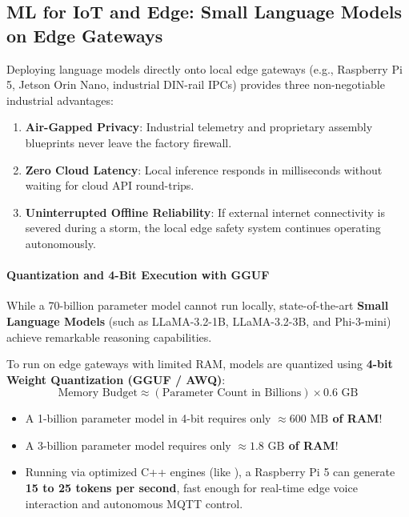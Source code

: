 \subsection{ML for IoT and Edge: Small Language Models on Edge Gateways}\label{subsec:iot_llm}

\begin{iotbox}
Deploying language models directly onto local edge gateways (e.g., Raspberry Pi 5, Jetson Orin Nano, industrial DIN-rail IPCs) provides three non-negotiable industrial advantages:
\begin{enumerate}
    \item \textbf{Air-Gapped Privacy}: Industrial telemetry and proprietary assembly blueprints never leave the factory firewall.
    \item \textbf{Zero Cloud Latency}: Local inference responds in milliseconds without waiting for cloud API round-trips.
    \item \textbf{Uninterrupted Offline Reliability}: If external internet connectivity is severed during a storm, the local edge safety system continues operating autonomously.
\end{enumerate}
\end{iotbox}

\paragraph{Quantization and 4-Bit Execution with GGUF}
While a 70-billion parameter model cannot run locally, state-of-the-art \textbf{Small Language Models} (such as LLaMA-3.2-1B, LLaMA-3.2-3B, and Phi-3-mini) achieve remarkable reasoning capabilities. 

To run on edge gateways with limited RAM, models are quantized using \textbf{4-bit Weight Quantization (GGUF / AWQ)}:
\begin{equation*}
\text{Memory Budget} \approx (\text{Parameter Count in Billions}) \times 0.6 \text{ GB}
\end{equation*}
\begin{itemize}
    \item A 1-billion parameter model in 4-bit requires only \textbf{$\approx 600\text{ MB}$ of RAM}!
    \item A 3-billion parameter model requires only \textbf{$\approx 1.8\text{ GB}$ of RAM}!
    \item Running via optimized C++ engines (like ), a Raspberry Pi 5 can generate \textbf{15 to 25 tokens per second}, fast enough for real-time edge voice interaction and autonomous MQTT control.
\end{itemize}

